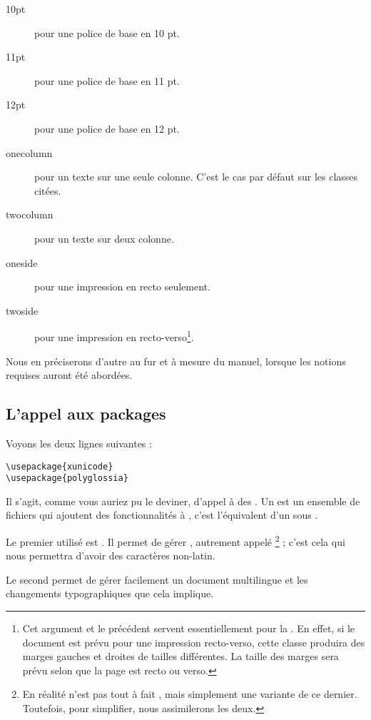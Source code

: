 \begin{description}
\item[10pt] pour une police de base en 10 pt.
\item[11pt] pour une police de base en 11 pt.
\item[12pt] pour une police de base en 12 pt.
\item[onecolumn] pour un texte sur une seule colonne. C'est le cas par défaut sur les classes citées.
\item[twocolumn] pour un texte sur deux colonne.
\item[oneside] pour une impression en recto seulement.
\item[twoside] pour une impression en recto-verso\footnote{Cet argument et le précédent servent essentiellement pour la  . En effet, si le document est prévu pour une impression recto-verso, cette classe produira des marges gauches et droites de tailles différentes. La taille des marges sera prévu selon que la page est recto ou verso.}.
\end{description}

Nous en préciserons d'autre au fur et à mesure du manuel, lorsque les notions requises auront été abordées.

\subsection{L'appel aux packages}

Voyons les deux lignes suivantes : 
\begin{verbatim}
\usepackage{xunicode}
\usepackage{polyglossia}
\end{verbatim}

Il s'agit, comme vous auriez pu le deviner, d'appel à des . Un  est un ensemble de fichiers qui ajoutent des fonctionnalités à \logiciel{\LaTex}, c'est l'équivalent d'un  sous . 

Le premier  utilisé est . Il permet de gérer , autrement appelé \footnote{En réalité  n'est pas tout à fait , mais simplement une variante de ce dernier. Toutefois, pour simplifier, nous assimilerons les deux.} ; c'est cela qui nous permettra d'avoir des caractères non-latin.

Le second permet de gérer facilement un document multilingue et les changements typographiques que cela implique.

